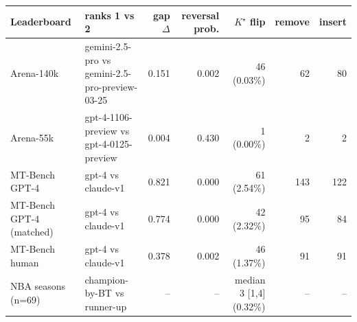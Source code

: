 \begin{tabular}{llrrrrr}
\toprule
 Leaderboard & ranks 1 vs 2 & gap $\Delta$ & reversal prob. & $K^\star$ flip & remove & insert \\
\midrule
Arena-140k & gemini-2.5-pro vs gemini-2.5-pro-preview-03-25 & 0.151 & 0.002 & 46 (0.03\%) & 62 & 80 \\
Arena-55k & gpt-4-1106-preview vs gpt-4-0125-preview & 0.004 & 0.430 & 1 (0.00\%) & 2 & 2 \\
MT-Bench GPT-4 & gpt-4 vs claude-v1 & 0.821 & 0.000 & 61 (2.54\%) & 143 & 122 \\
MT-Bench GPT-4 (matched) & gpt-4 vs claude-v1 & 0.774 & 0.000 & 42 (2.32\%) & 95 & 84 \\
MT-Bench human & gpt-4 vs claude-v1 & 0.378 & 0.002 & 46 (1.37\%) & 91 & 91 \\
NBA seasons (n=69) & champion-by-BT vs runner-up & -- & -- & median 3 [1,4] (0.32\%) & -- & -- \\
\bottomrule
\end{tabular}
